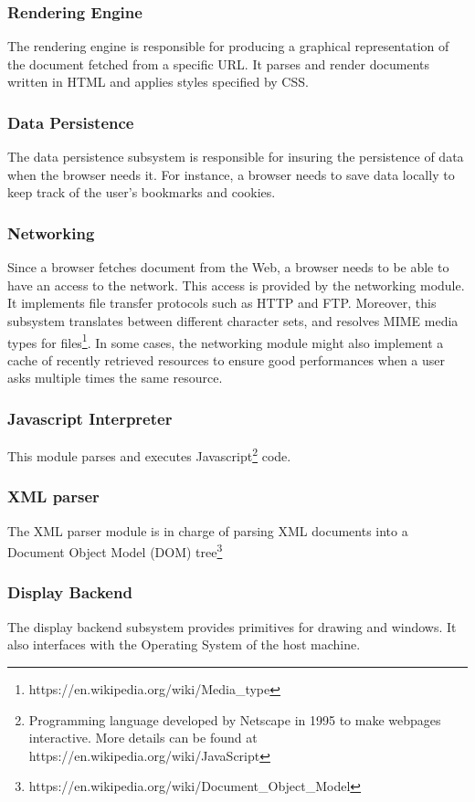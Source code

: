 \documentclass[journal]{IEEEtran}
\begin{document}
\subsubsection{Rendering Engine}
The rendering engine is responsible for producing a graphical representation of the document fetched from a specific URL. It parses and render documents written in HTML and applies styles specified by CSS.

\subsubsection{Data Persistence}
The data persistence subsystem is responsible for insuring the persistence of data when the browser needs it. For instance, a browser needs to save data locally to keep track of the user's bookmarks and cookies.

\subsubsection{Networking}
Since a browser fetches document from the Web, a browser needs to be able to have an access to the network. This access is provided by the networking module. It implements file transfer protocols such as HTTP and FTP. Moreover, this subsystem translates between different character sets, and resolves MIME media types for files\footnote{https://en.wikipedia.org/wiki/Media\_type}. In some cases, the networking module might also implement a cache of recently retrieved resources to ensure good performances when a user asks multiple times the same resource.

\subsubsection{Javascript Interpreter}
This module parses and executes Javascript\footnote{Programming language developed by Netscape in 1995 to make webpages interactive. More details can be found at https://en.wikipedia.org/wiki/JavaScript} code.

\subsubsection{XML parser}
The XML parser module is in charge of parsing XML documents into a Document Object Model (DOM) tree\footnote{https://en.wikipedia.org/wiki/Document\_Object\_Model}

\subsubsection{Display Backend}
The display backend subsystem provides primitives for drawing and windows. It also interfaces with the Operating System of the host machine.
\end{document}
